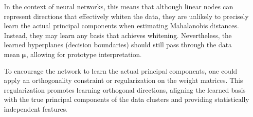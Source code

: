 In the context of neural networks, this means that although linear nodes can represent directions that effectively whiten the data, they are unlikely to precisely learn the actual principal components when estimating Mahalanobis distances. Instead, they may learn any basis that achieves whitening. Nevertheless, the learned hyperplanes (decision boundaries) should still pass through the data mean \(\boldsymbol{\mu}\), allowing for prototype interpretation.

To encourage the network to learn the actual principal components, one could apply an orthogonality constraint or regularization on the weight matrices. This regularization promotes learning orthogonal directions, aligning the learned basis with the true principal components of the data clusters and providing statistically independent features.
